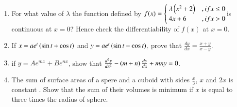 \begin{enumerate}
\item For what value of $\lambda$ the function defined by $f(x) = \begin{cases} \lambda\left(x^2+2\right)&, if x \leq 0 \\ 4x+6&, if x>0 \end{cases}$is continuous at $x=0$? Hence check the differentiability of $f(x)$ at $x=0$. 

\item If $x = ae^t\left(\sin{t}+\cos{t}\right)$ and $y = ae^t\left(\sin{t}-\cos{t}\right)$, prove that $\frac{dy}{dx}=\frac{x+y}{x-y}$. 

\item if $y = Ae^{mx} + Be^{nx}$, show that $\frac{d^{2}y}{dx^2} -\left(m+n\right)\frac{dy}{dx} + mny = 0$. 

\item The sum of surface areas of a spere and a cuboid with sides $\frac{x}{3}$, $x$ and $2x$ is constant . Show that the sum of their volumes is minimum if $x$ is equal to three times the radius of sphere.
\end{enumerate}
